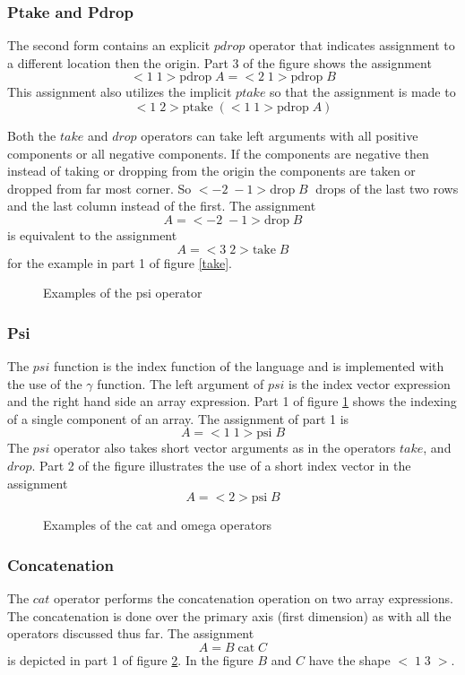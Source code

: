 \subsubsection{Ptake and Pdrop}
The second form contains an explicit $pdrop$ operator that indicates assignment
to a different location then the origin.  Part 3 of the figure shows the
assignment
$$<1\;1>\mbox{pdrop}\;A=<2\;1>\mbox{pdrop}\;B$$
This assignment also utilizes
the implicit $ptake$ so that the assignment is made to
$$<1\;2> \mbox{ptake}\;(<1\;1> \mbox{pdrop}\;A)$$

Both the $take$ and $drop$
operators can take left arguments with all positive components or all negative
components.  If the components are negative then instead of taking or dropping
from the origin the components are taken or dropped from far most corner.  So
$<-2\;-1>\mbox{drop}\;B\;$ drops of the last two rows and the last column 
instead of the first.  The assignment
$$A=<-2\;-1>\mbox{drop}\;B$$ is equivalent to the assignment
$$A=<3\;2>\mbox{take}\;B$$ for the example in part 1 of figure \ref{take}.

\begin{figure}
\caption{Examples of the psi operator}
\label{psi}
\end{figure}
\subsubsection{Psi}
The $psi$ function is the index function of the language and is implemented
with the use of the $\gamma$ function.  
The left argument of $psi$
is the index vector expression and the right hand side an array expression.
Part 1 of figure \ref{psi} shows
the indexing of a single component of an array.  The assignment of part 1 is
$$A=<1\;1>\mbox{psi}\;B$$  The $psi$ operator also takes short vector arguments
as in the operators $take$, and $drop$.  Part 2 of the figure illustrates the
use of a short index vector in the assignment
$$A=<2>\mbox{psi}\;B$$

\begin{figure}
\caption{Examples of the cat and omega operators}
\label{cat_o}
\end{figure}
\subsubsection{Concatenation}
The $cat$ operator performs the concatenation operation on two array 
expressions.  The concatenation is done over the primary axis (first dimension)
as with all the operators discussed thus far.  The assignment
$$A=B\;\mbox{cat}\;C$$ is depicted in part 1 of figure \ref{cat_o}.
In the figure $B$ and $C$ have the shape $<\; 1\; 3\; >$.

